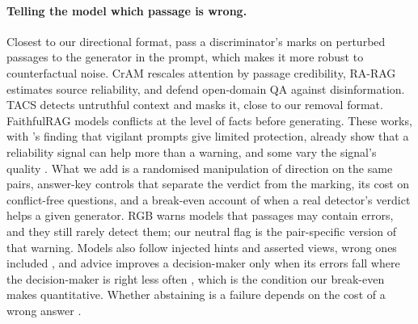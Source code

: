 \paragraph{Telling the model which passage is wrong.}
Closest to our directional format, \citet{hong2024gullible} pass a discriminator's marks on perturbed passages to the
generator in the prompt, which makes it more robust to counterfactual noise. CrAM \citep{deng2025cram} rescales
attention by passage credibility, RA-RAG \citep{hwang2025rarag} estimates source reliability, and
\citet{weller2024defending} defend open-domain QA against disinformation. TACS \citep{yu2024tacs} detects untruthful context and masks it,
close to our removal format. FaithfulRAG \citep{zhang2025faithfulrag} models
conflicts at the level of facts before generating. These works, with \citet{pan2023risk}'s finding that vigilant
prompts give limited protection, already show that a reliability signal can help more than a warning, and some vary
the signal's quality \citep{hong2024gullible,pan2024credibility}. What we add is a randomised manipulation of
direction on the same pairs, answer-key controls that separate the verdict from the marking, its cost on
conflict-free questions, and a break-even account of when a real detector's verdict helps a given generator. RGB \citep{chen2024rgb} warns models that passages may contain errors, and they still rarely
detect them; our neutral flag is the pair-specific version of that warning. Models also follow injected hints and asserted views, wrong
ones included \citep{turpin2023unfaithful,sharma2024sycophancy}, and advice improves a decision-maker only when its
errors fall where the decision-maker is right less often \citep{bansal2021accurate,mozannar2020defer}, which is the
condition our break-even makes quantitative. Whether
abstaining is a failure depends on the cost of a wrong answer \citep{wen2025abstention,song2025trustscore}.

